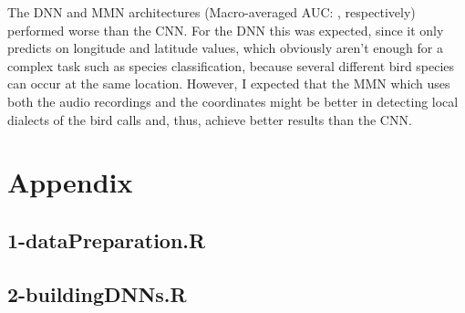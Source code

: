 \documentclass[12pt,twoside]{scrreport}
\begin{document}
The DNN and MMN architectures (Macro-averaged AUC: , respectively) performed worse than the CNN. For the DNN this was expected, since it only predicts on longitude and latitude values, which obviously aren't enough for a complex task such as species classification, because several different bird species can occur at the same location. However, I expected that the MMN which uses both the audio recordings and the coordinates might be better in detecting local dialects of the bird calls and, thus, achieve better results than the CNN. 







\newpage
\renewcommand{\bibname}{References}
 

\chapter*{Appendix}
\lstset{style=Rstyle}
\section*{1-dataPreparation.R}

\newpage
\section*{2-buildingDNNs.R}

\newpage
\end{document}
